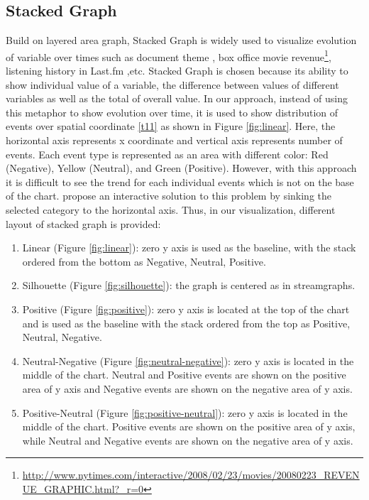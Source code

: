 \subsection{Stacked Graph}
Build on layered area graph, Stacked Graph is widely used to visualize evolution of variable over times such as document theme \cite{havre}, box office movie revenue\footnote{\url{http://www.nytimes.com/interactive/2008/02/23/movies/20080223_REVENUE_GRAPHIC.html?_r=0}}, listening history in Last.fm \cite{byron},etc. Stacked Graph is chosen because its ability to show individual value of a variable, the difference between values of different variables as well as the total of overall value. In our approach, instead of using this metaphor to show evolution over time, it is used to show distribution of events over spatial coordinate \ref{t11} as shown in Figure \ref{fig:linear}. Here, the horizontal axis represents x coordinate and vertical axis represents number of events. Each event type is represented as an area with different color: Red (Negative), Yellow (Neutral), and Green (Positive). However, with this approach it is difficult to see the trend for each individual events which is not on the base of the chart. \cite{alan} propose an interactive solution to this problem by sinking the selected category to the horizontal axis. Thus, in our visualization, different layout of stacked graph is provided: 
\begin{enumerate}
  \item Linear (Figure \ref{fig:linear}): zero y axis is used as the baseline, with the stack ordered from the bottom as Negative, Neutral, Positive.
  \item Silhouette (Figure \ref{fig:silhouette}): the graph is centered as in streamgraphs.
  \item Positive (Figure \ref{fig:positive}): zero y axis is located at the top of the chart and is used as the baseline with the stack ordered from the top as Positive, Neutral, Negative.
  \item Neutral-Negative (Figure \ref{fig:neutral-negative}): zero y axis is located in the middle of the chart. Neutral and Positive events are shown on the positive area of y axis and Negative events are shown on the negative area of y axis.
  \item Positive-Neutral (Figure \ref{fig:positive-neutral}): zero y axis is located in the middle of the chart. Positive events are shown on the positive area of y axis, while Neutral and Negative events are shown on the negative area of y axis.
\end{enumerate}

